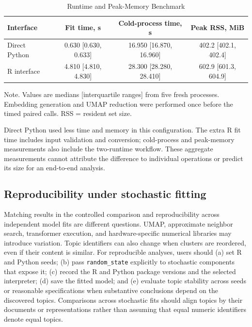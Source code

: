 \documentclass[12pt]{article}
\newcommand{\code}[1]{\texttt{#1}}
\begin{document}
\begin{table}[htbp]
\centering
\caption{Runtime and Peak-Memory Benchmark}
\label{tab:benchmark}
\begin{threeparttable}
\begin{tabular}{lccc}
\toprule
Interface & Fit time, s & Cold-process time, s & Peak RSS, MiB \\
\midrule
Direct Python & 0.630 [0.630, 0.633] & 16.950 [16.870, 16.960] & 402.2 [402.1, 402.4] \\
R interface & 4.810 [4.810, 4.830] & 28.300 [28.280, 28.410] & 602.9 [601.3, 604.9] \\
\bottomrule
\end{tabular}
\begin{tablenotes}
\footnotesize
\item Note. Values are medians [interquartile ranges] from five fresh processes. Embedding generation and UMAP reduction were performed once before the timed paired calls. RSS = resident set size.
\end{tablenotes}
\end{threeparttable}
\end{table}

Direct Python used less time and memory in this configuration. The extra R fit time includes input validation and conversion; cold-process and peak-memory measurements also include the two-runtime workflow. These aggregate measurements cannot attribute the difference to individual operations or predict its size for an end-to-end analysis.

\subsection{Reproducibility under stochastic fitting}

Matching results in the controlled comparison and reproducibility across independent model fits are different questions. UMAP, approximate neighbor search, transformer execution, and hardware-specific numerical libraries may introduce variation. Topic identifiers can also change when clusters are reordered, even if their content is similar. For reproducible analyses, users should (a) set R and Python seeds; (b) pass \code{random\_state} explicitly to stochastic components that expose it; (c) record the R and Python package versions and the selected interpreter; (d) save the fitted model; and (e) evaluate topic stability across seeds or reasonable specifications when substantive conclusions depend on the discovered topics. Comparisons across stochastic fits should align topics by their documents or representations rather than assuming that equal numeric identifiers denote equal topics.
\end{document}
